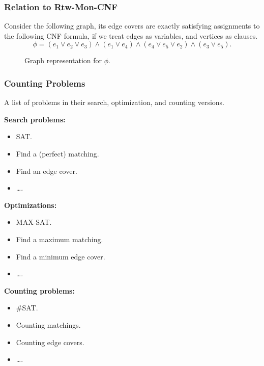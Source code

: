 \documentclass[mathserif]{beamer}
\begin{document}
\begin{frame}
	\frametitle{ Relation to Rtw-Mon-CNF}
	Consider the following graph, its edge covers are exactly satisfying assignments to the following CNF formula, if we treat edges as variables, and vertices as clauses.
	\[
		\phi = (e_1 \vee e_2 \vee e_3) \wedge (e_1 \vee e_4) \wedge (e_4 \vee e_5 \vee e_2 ) \wedge (e_3 \vee e_5).
	\]

	\begin{figure}[htp]
		\centering
		
		\caption{Graph representation for $\phi$.}
	\end{figure}
\end{frame}

\begin{frame}
	\frametitle{Counting Problems}
	A list of problems in their search, optimization, and counting versions.
	\bigskip

	\begin{minipage}[tb]{0.3\linewidth}
		{\bf Search problems:}
		\begin{itemize}
			\item SAT.
				\pause
			\item Find a (perfect) matching.
				\pause
			\item Find an edge cover.
			\item \dots.
		\end{itemize}
	\end{minipage}
	\pause
	\begin{minipage}[tb]{0.3\linewidth}
		{\bf Optimizations:}
		\begin{itemize}
			\item MAX-SAT.
				\pause
			\item Find a maximum matching.
				\pause
			\item Find a minimum edge cover.
			\item \dots.
		\end{itemize}
	\end{minipage}
	\pause
	\begin{minipage}[tb]{0.3\linewidth}
		{\bf Counting problems:}
		\begin{itemize}
			\item \#SAT.
				\pause
			\item Counting matchings.
				\pause
			\item Counting edge covers.
			\item \dots.
		\end{itemize}
	\end{minipage}
\end{frame}
\end{document}
